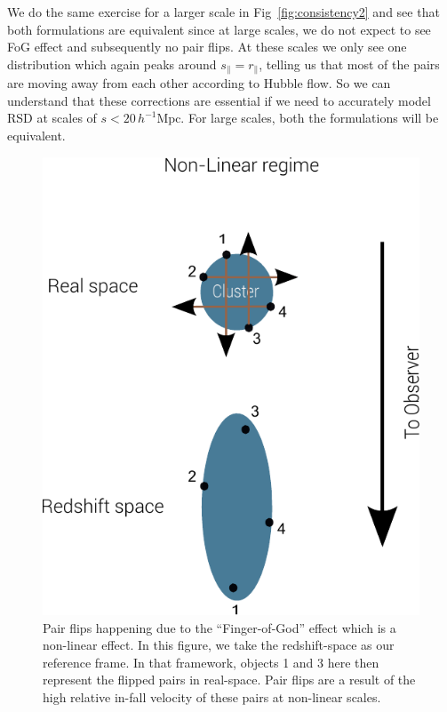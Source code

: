 \documentclass[a4paper,fleqn,usenatbib]{mnras}
\begin{document}
	 We do the same exercise for a larger scale in Fig~\ref{fig:consistency2} and see that both formulations are equivalent since at large scales, we do not expect to see FoG effect and subsequently no pair flips. At these scales we only see one distribution which again peaks around $s_{\parallel} = r_{\parallel}$, telling us that most of the pairs are moving away from each other according to Hubble flow. So we can understand that these corrections are essential if we need to accurately model RSD at scales of $s<20  \,h^{-1}\mathrm{Mpc}$. For large scales, both the formulations will be equivalent.
	 
	\begin{figure}
		\centering
		\includegraphics[scale=0.6]{RSD_nonlin1}
		\caption{Pair flips happening due to the ``Finger-of-God'' effect which is a non-linear effect. In this figure, we take the redshift-space as our reference frame. In that framework, objects 1 and 3 here then represent the flipped pairs in real-space. Pair flips are a result of the high relative in-fall velocity of these pairs at non-linear scales.}
		\label{fig:flip_pairs}
	\end{figure}
	
\end{document}
